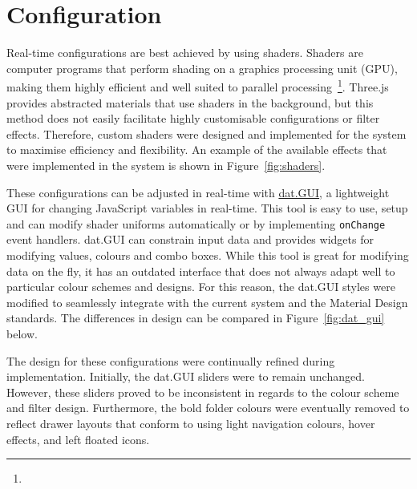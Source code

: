 \section{Configuration} {
\label{sec:configuration_implementation}

	Real-time configurations are best achieved by using shaders. Shaders are computer programs that perform shading on a graphics processing unit (GPU), making them highly efficient and well suited to parallel processing~\footnote{}. Three.js provides abstracted materials that use shaders in the background, but this method does not easily facilitate highly customisable configurations or filter effects. Therefore, custom shaders were designed and implemented for the system to maximise efficiency and flexibility. An example of the available effects that were implemented in the system is shown in Figure~\ref{fig:shaders}.

	

	These configurations can be adjusted in real-time with \href{http://workshop.chromeexperiments.com/}{dat.GUI}, a lightweight GUI for changing JavaScript variables in real-time. This tool is easy to use, setup and can modify shader uniforms automatically or by implementing \texttt{onChange} event handlers. dat.GUI can constrain input data and provides widgets for modifying values, colours and combo boxes. While this tool is great for modifying data on the fly, it has an outdated interface that does not always adapt well to particular colour schemes and designs. For this reason, the dat.GUI styles were modified to seamlessly integrate with the current system and the Material Design standards. The differences in design can be compared in Figure~\ref{fig:dat_gui} below.

	

	The design for these configurations were continually refined during implementation. Initially, the dat.GUI sliders were to remain unchanged. However, these sliders proved to be inconsistent in regards to the colour scheme and filter design. Furthermore, the bold folder colours were eventually removed to reflect drawer layouts that conform to using light navigation colours, hover effects, and left floated icons.

}


